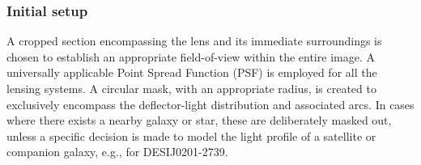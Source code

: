 \documentclass{aa}
\begin{document}
\subsubsection{Initial setup}
A cropped section encompassing the lens and its immediate surroundings is chosen to establish an appropriate field-of-view within the entire image. A universally applicable Point Spread Function (PSF) is employed for all the lensing systems. A circular mask, with an appropriate radius, is created to exclusively encompass the deflector-light distribution and associated arcs. In cases where there exists a nearby galaxy or star, these are deliberately masked out, unless a specific decision is made to model the light profile of a satellite or companion galaxy, e.g., for DESIJ0201-2739.
\end{document}
